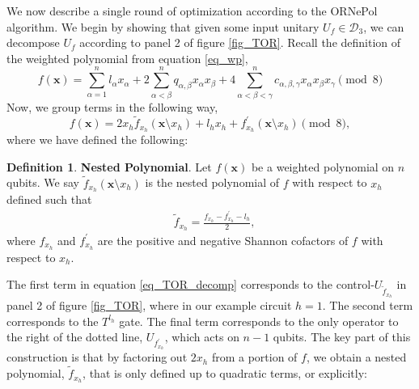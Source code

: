\documentclass[notitlepage]{article}
\theoremstyle{definition}
\newtheorem{definition}{Definition}[section]
\theoremstyle{problem}
\theoremstyle{lemma}
\begin{document}
We now describe a single round of optimization according to the ORNePol algorithm. We begin by showing that given some input unitary $U_f \in \mathcal{D}_3$, we can decompose $U_f$ according to panel 2 of figure \ref{fig_TOR}. Recall the definition of the weighted polynomial from equation \ref{eq_wp},
\begin{equation}
f(\mathbf{x}) = \sum_{\alpha=1}^{n}l_{\alpha}x_\alpha + 2\sum_{\alpha<\beta}^{n} q_{\alpha,\beta}x_\alpha x_\beta + 4\sum_{\alpha<\beta<\gamma}^{n}c_{\alpha,\beta,\gamma}x_\alpha x_\beta x_\gamma \pmod{8}
\end{equation}
Now, we group terms in the following way,
\begin{equation}
\label{eq_TOR_decomp}
f(\mathbf{x}) = 2x_h\tilde{f}_{x_h}(\mathbf{x}\setminus x_h) + l_h x_h + f^\prime_{x_h}(\mathbf{x}\setminus x_h) \pmod{8},
\end{equation}
where we have defined the following:

\begin{definition}{\textbf{Nested Polynomial}. }
	Let $f(\mathbf{x})$ be a weighted polynomial on $n$ qubits. We say $\tilde{f}_{x_h}(\mathbf{x}\setminus x_h)$ is the nested polynomial of $f$ with respect to $x_h$ defined such that
	\begin{align}	
	&\tilde{f}_{x_h} = \frac{f_{x_h}-f^\prime_{x_h}-l_h}{2},
	\end{align}
	where $f_{x_h}$ and $f^\prime_{x_h}$ are the positive and negative Shannon cofactors of $f$ with respect to $x_h$.	
\end{definition}
The first term in equation \ref{eq_TOR_decomp} corresponds to the control-$U_{\tilde{f}_{x_h}}$ in panel 2 of figure \ref{fig_TOR}, where in our example circuit $h=1$. The second term corresponds to the $T^{l_h}$ gate. The final term corresponds to the only operator to the right of the dotted line, $U_{f^\prime_{x_h}}$, which acts on $n-1$ qubits. The key part of this construction is that by factoring out $2x_h$ from a portion of $f$, we obtain a nested polynomial, $\tilde{f}_{x_h}$, that is only defined up to quadratic terms, or explicitly:
\end{document}
